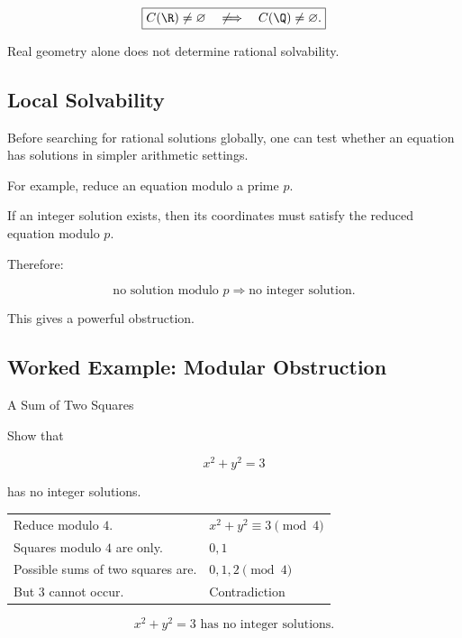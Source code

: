 \[
\boxed{
C(\R)\neq\varnothing
\quad\not\Longrightarrow\quad
C(\Q)\neq\varnothing.
}
\]

Real geometry alone does not determine rational solvability.

\subsection{Local Solvability}
\label{subsec:local-solvability-diophantine}

Before searching for rational solutions globally, one can test whether an
equation has solutions in simpler arithmetic settings.

For example, reduce an equation modulo a prime \(p\).

If an integer solution exists, then its coordinates must satisfy the reduced
equation modulo \(p\).

Therefore:

\[
\boxed{
\text{no solution modulo }p
\Longrightarrow
\text{no integer solution}.
}
\]

This gives a powerful obstruction.

\subsection{Worked Example: Modular Obstruction}
\label{subsec:worked-modular-obstruction}

\begin{workedexamplebox}{A Sum of Two Squares}

Show that

\[ x^2+y^2=3 \]

has no integer solutions.

\begin{tabularx}{\textwidth}{@{}>{\raggedright\arraybackslash}p{}X@{}}
Reduce modulo \(4\). & \(x^2+y^2\equiv3\pmod4\)\\
Squares modulo \(4\) are only. & \(0,1\)\\
Possible sums of two squares are. & \(0,1,2\pmod4\)\\
But \(3\) cannot occur. & Contradiction
\end{tabularx}

\begin{answerbox}
\[ \boxed{x^2+y^2=3\text{ has no integer solutions}.} \]
\end{answerbox}
\end{workedexamplebox}

